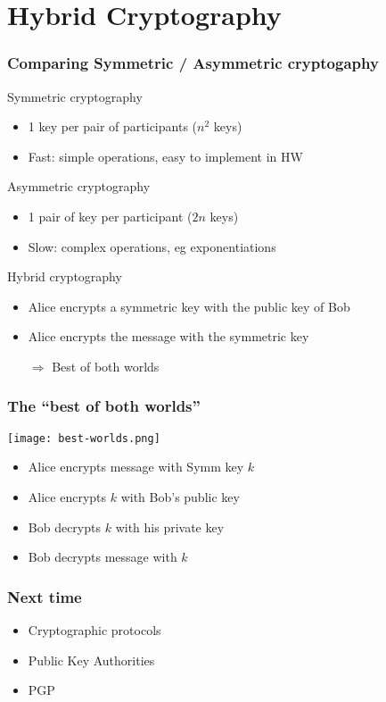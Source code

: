 \documentclass[
hyperref={pdfpagelabels=false}
,xcolor=table
]
{beamer}
\begin{document}
\section{Hybrid Cryptography}

\begin{frame}
  \frametitle{Comparing Symmetric / Asymmetric cryptogaphy}

  \begin{block}{Symmetric cryptography}
    \begin{itemize}
    \item 1 key per pair of participants ($n^2$ keys)
    \item Fast: simple operations, easy to implement in HW
    \end{itemize}
  \end{block}

  \begin{block}{Asymmetric cryptography}
    \begin{itemize}
    \item 1 pair of key per participant ($2n$ keys)
    \item Slow: complex operations, eg exponentiations
    \end{itemize}
  \end{block}


  \begin{block}{Hybrid cryptography}
    \begin{itemize}
    \item Alice encrypts a symmetric key with the public key of Bob
    \item Alice encrypts the message with the symmetric key
    \item[$\Rightarrow$] Best of both worlds
    \end{itemize}
  \end{block}
  
\end{frame}


\begin{frame}
  \frametitle{The ``best of both worlds''}

  \begin{center}
    \texttt{[image: best-worlds.png]}
  \end{center}

  
  \begin{itemize}
  \item Alice encrypts message with Symm key $k$
  \item Alice encrypts $k$ with Bob's public key
  \item Bob decrypts $k$ with his private key
  \item Bob decrypts message with $k$
  \end{itemize}
  
\end{frame}

\begin{frame}
  \frametitle{Next time}

  \begin{itemize}
  \item Cryptographic protocols
  \item Public Key Authorities
  \item PGP
  \end{itemize}
\end{frame}
\end{document}
